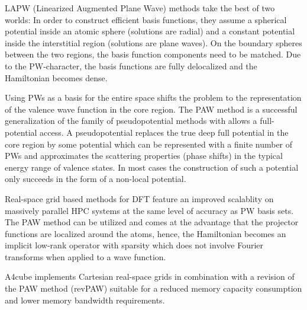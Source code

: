\documentclass[oribibl]{llncs}
\newcommand{\codename}{A4cube}
\begin{document}
LAPW (Linearized Augmented Plane Wave) methods take the best of two worlds:
In order to construct efficient basis functions, 
they assume a spherical potential inside an atomic sphere (solutions are radial)
and a constant potential inside the interstitial region (solutions are plane waves). 
On the boundary spheres between the two regions, the basis function components need to be matched.
Due to the \ac{PW}-character, the basis functions are fully delocalized and 
the Hamiltonian becomes dense.

Using \ac{PW}s as a basis for the entire space shifts the problem to the representation of the valence wave function in the core region.
The \ac{PAW} method is a successful generalization of the family of pseudopotential methods with allows a full-potential access.
A pseudopotential replaces the true deep full potential in the core region
by some potential which can be represented with a finite number of \ac{PW}s
and approximates the scattering properties (phase shifts) in the typical energy
range of valence states.
In most cases the construction of such a potential only succeeds in the form of
a non-local potential.

Real-space grid based methods for \ac{DFT}
feature an improved scalablity on massively parallel \ac{HPC} systems at the same level of accuracy as \ac{PW} basis sets. 
The \ac{PAW} method can be utilized and comes at the advantage that the projector functions are localized around the atoms, 
hence, the Hamiltonian becomes an implicit low-rank operator with sparsity which does not involve Fourier transforms when applied to a wave function.


\codename{} implements Cartesian real-space grids 
in combination with a revision of the \ac{PAW} method (revPAW) suitable for
a reduced memory capacity consumption and lower memory bandwidth requirements.


 
\end{document}
